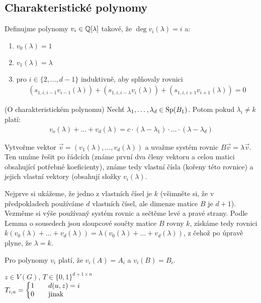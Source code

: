 \subsection{Charakteristické polynomy}


\df Definujme polynomy $v_i \in \mathbb{Q}[\lambda]$ takové, že $\deg v_i(\lambda) = i$ a:
\begin{enumerate} 
	\item $v_0(\lambda) = 1$
	\item $v_1(\lambda) = \lambda$
	\item pro $i \in \{ 2, \dots, d-1\}$ induktivně, aby splňovaly rovnici 
	\begin{align}
		(s_{1,i,i-1} v_{i-1}(\lambda)) + (s_{1,i,i-\lambda}v_i(\lambda)) + (s_{1,i,i+1}v_{i+1}(\lambda)) = 0
	\end{align}
\end{enumerate}

\lm (O charakteristickém polynomu) Nechť $\lambda_1,\ldots,\lambda_d \in \operatorname{Sp}(B_1)$. Potom pokud $\lambda_i \neq k$ platí:
\begin{align}
	v_o(\lambda) + \ldots + v_d(\lambda) = c \cdot (\lambda - \lambda_1) \cdot \ldots \cdot (\lambda - \lambda_d)
\end{align}

\dk Vytvořme vektor $\vec{v} = (v_1(\lambda), \ldots, v_d(\lambda))$ a uvažme systém rovnic $B\vec{v} = \lambda \vec{v}$. Ten umíme řešit po řádcích (známe první dva členy vektoru a celou matici obsahující potřebné koeficienty), známe tedy vlastní čísla (kořeny této rovnice) a jejich vlastní vektory (obsahují složky $v_i(\lambda)$.

Nejprve si ukážeme, že jedno z vlastních čísel je $k$ (všimněte si, že v předpokladech používáme $d$ vlastních čísel, ale dimenze matice $B$ je $d+1$). Vezměme si výše používaný systém rovnic a sečtěme levé a pravé strany. Podle Lemma o sousedech jsou sloupcové součty matice $B$ rovny $k$, získáme tedy rovnici $k(v_0(\lambda) + \ldots + v_d(\lambda)) = \lambda (v_0(\lambda) + \ldots + v_d(\lambda))$, z čehož po úpravě plyne, že $\lambda = k$.


\lm Pro polynomy $v_i$ platí, že $v_i(A) = A_i$ a $v_i(B) = B_i$.



\df $z\in V(G)$, $T\in\{0,1\}^{d+1 \times n}$\\
\indent $T_{i,u} = \left\{\begin{matrix}
1\quad & d(u,z) = i\hfill \\
0\quad & \text{jinak}\hfill
\end{matrix}\right.$

